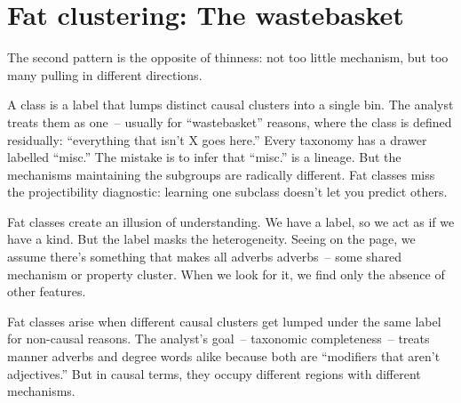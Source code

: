 \section{Fat clustering: The wastebasket}
\label{sec:8:fat}

The second pattern is the opposite of thinness: not too little mechanism, but too many pulling in different directions.

A  class is a label that lumps distinct causal clusters into a single bin. The analyst treats them as one~-- usually for \enquote{wastebasket} reasons, where the class is defined residually: \enquote{everything that isn't X goes here.} Every taxonomy has a drawer labelled \enquote{misc.} The mistake is to infer that \enquote{misc.} is a lineage. But the mechanisms maintaining the subgroups are radically different. Fat classes miss the projectibility diagnostic: learning one subclass doesn't let you predict others.

Fat classes create an illusion of understanding. We have a label, so we act as if we have a kind. But the label masks the heterogeneity. Seeing  on the page, we assume there's something that makes all adverbs adverbs~-- some shared mechanism or property cluster. When we look for it, we find only the absence of other features.

Fat classes arise when different causal clusters get lumped under the same label for non-causal reasons. The analyst's goal~-- taxonomic completeness~-- treats manner adverbs and degree words alike because both are \enquote{modifiers that aren't adjectives.} But in causal terms, they occupy different regions with different mechanisms.

